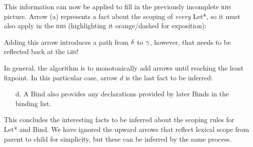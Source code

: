 This information can now be applied to fill in the previously
incomplete \textsc{rhs} picture. Arrow (a) represents a
fact about the scoping of \emph{every} Let*, so it must also apply in the
\textsc{rhs} (highlighting it orange/dashed for exposition):
\begin{center}
\end{center}
Adding this arrow introduces a path from $\delta$ to $\gamma$,
however, that needs to be reflected back at the \textsc{lhs}!
\begin{center}
\end{center}
In general, the algorithm is to monotonically add arrows until
reaching the least fixpoint. In this particular case, arrow $d$ is the last
fact to be inferred:
\begin{enumerate}
\item[d.] A Bind also provides any declarations provided by later Binds
  in the binding list.
\end{enumerate}
This concludes the interesting facts to be inferred about the scoping
rules for Let* and Bind. We have ignored the upward arrows that reflect
lexical scope from parent to child for simplicity, but these can
be inferred by the same process.


